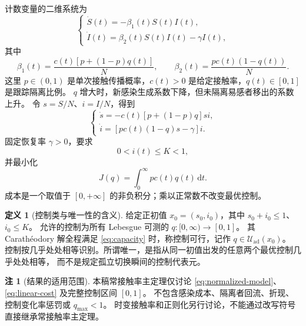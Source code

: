 \documentclass[11pt,a4paper,UTF8]{ctexart}
\theoremstyle{definition}
\newtheorem{definition}[theorem]{定义}
\newtheorem{remark}[theorem]{注}
\newcommand{\Uad}{\mathcal U_{\mathrm{ad}}}
\newcommand{\dd}{\,\mathrm d}
\begin{document}
计数变量的二维系统为
\begin{equation}
\begin{cases}
\dot S(t)=-\beta_1(t)S(t)I(t),\\
\dot I(t)=\beta_2(t)S(t)I(t)-\gamma I(t),
\end{cases}
\label{eq:count-model}
\end{equation}
其中
\begin{equation}
\beta_1(t)=\frac{c(t)[p+(1-p)q(t)]}{N},\qquad
\beta_2(t)=\frac{pc(t)(1-q(t))}{N}.
\label{eq:beta12}
\end{equation}
这里 $p\in(0,1)$ 是单次接触传播概率，$c(t)>0$ 是给定接触率，$q(t)\in[0,1]$ 是跟踪隔离比例。
$q$ 增大时，新感染生成系数下降，但未隔离易感者移出的系数上升。
令 $s=S/N$、$i=I/N$，得到
\begin{equation}
\begin{cases}
\dot s=-c(t)[p+(1-p)q]si,\\
\dot i=[pc(t)(1-q)s-\gamma]i.
\end{cases}
\label{eq:normalized-model}
\end{equation}
固定恢复率 $\gamma>0$，要求
\begin{equation}
0<i(t)\le K<1,
\label{eq:capacity}
\end{equation}
并最小化
\begin{equation}
J(q)=\int_0^\infty pc(t)q(t)\dd t.
\label{eq:linear-cost}
\end{equation}
成本是一个取值于 $[0,+\infty]$ 的非负积分；乘以正常数不改变最优控制。

\begin{definition}[控制类与唯一性的含义]
\label{def:admissible}
给定正初值 $x_0=(s_0,i_0)$，其中 $s_0+i_0\le1$、$i_0\le K$。
允许的控制为所有 Lebesgue 可测的 $q:[0,\infty)\to[0,1]$。
其 Carath\'eodory 解全程满足 \eqref{eq:capacity} 时，称控制可行，记作 $q\in\Uad(x_0)$。
控制按几乎处处相等识别。所谓唯一，是指从同一初值出发的任意两个最优控制几乎处处相等，
而不是规定孤立切换瞬间的控制代表元。
\end{definition}

\begin{remark}[结果的适用范围]
本稿常接触率主定理仅讨论 \eqref{eq:normalized-model}、\eqref{eq:linear-cost} 及完整控制区间 $[0,1]$。
不包含感染成本、隔离者回流、折现、控制变化率惩罚或 $q_{\max}<1$。
时变接触率和正则化另行讨论，不能通过改写符号直接继承常接触率主定理。
\end{remark}
\end{document}

